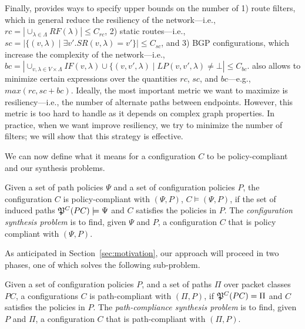 Finally, \name provides ways to specify upper bounds on the number of
1) route filters, which in general reduce the resiliency of the network---i.e., $rc=|\cup_{\lambda\in \Lambda} RF(\lambda)|\leq C_{rc}$,
2) static routes---i.e., $sc=|\{(v,\lambda)\mid \exists v'. SR(v,\lambda)=v'\}|\leq C_{sc}$, and
3) BGP configurations, which increase the complexity of the network---i.e., 
$bc=|\cup_{v,\lambda\in V\times\Lambda} IF(v,\lambda)\cup \{(v,v',\lambda)\mid LP(v,v',\lambda)\neq \bot|\leq C_{bc}$.
\name also allows to minimize certain expressions over the quantities $rc$, $sc$, and $bc$---e.g., $max(rc, sc+bc)$. 
Ideally, the most important metric we want to maximize is resiliency---i.e.,
the number of alternate paths between endpoints.
However, this metric is too hard to handle as it depends on complex graph properties. 
In practice, when we want improve resiliency, we try to minimize
the number of filters; we will show that this strategy is effective. 




\noindent We can now define what it means for a configuration $C$ to be policy-compliant
and our synthesis problems.
\begin{definition}
	Given a set of path policies $\Psi$ and a set of configuration policies $P$,
	the configuration $C$ is policy-compliant with $(\Psi,P)$,
	$C \models (\Psi,P)$, if the set of
	induced paths $\mathfrak{P}^C(PC) \models \Psi$
	and $C$ satisfies the policies in $P$.
	The \emph{configuration synthesis problem} is to find, given $\Psi$ and $P$,
a configuration $C$ that is policy compliant with $(\Psi,P)$.
\end{definition}

As anticipated in Section~\ref{sec:motivation}, our approach will proceed in two phases,
one of which solves the following sub-problem.  
\begin{definition}
Given a set of configuration policies $P$,
and a set of paths $\Pi$ over packet classes $PC$,
	a configurations $C$ is path-compliant with 
	$(\Pi,P)$,
	if $\mathfrak{P}^C(PC)=\Pi$ and $C$ satisfies the policies in $P$.
	The \emph{path-compliance synthesis problem} is to find, given $P$ and $\Pi$,
a configuration $C$ that is path-compliant with $(\Pi,P)$.
\end{definition}




